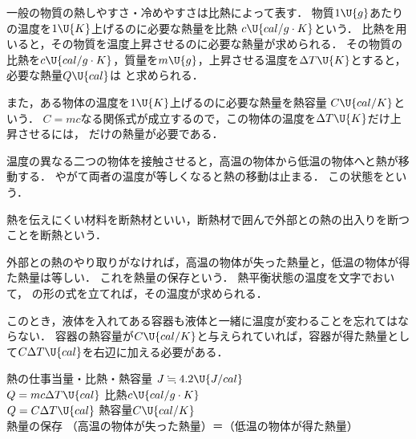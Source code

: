 一般の物質の熱しやすさ・冷めやすさは比熱によって表す．
物質$1\U{g}$あたりの温度を$1\U{K}$上げるのに必要な熱量を{\gtfamily 比熱} $c\U{cal/g\cdot K}$という．
比熱を用いると，その物質を温度上昇させるのに必要な熱量が求められる．
その物質の比熱を$c\U{cal/g\cdot K}$，質量を$m\U{g}$，上昇させる温度を$\Delta T\U{K}$とすると，必要な熱量$Q\U{cal}$は
と求められる．

また，ある物体の温度を$1\U{K}$上げるのに必要な熱量を{\gtfamily 熱容量} $C\U{cal/K}$という．
$C=mc$なる関係式が成立するので，この物体の温度を$\Delta T\U{K}$だけ上昇させるには，
だけの熱量が必要である．

温度の異なる二つの物体を接触させると，高温の物体から低温の物体へと熱が移動する．
やがて両者の温度が等しくなると熱の移動は止まる．
この状態をという．

熱を伝えにくい材料を{\gtfamily 断熱材}といい，断熱材で囲んで外部との熱の出入りを断つことを{\gtfamily 断熱}という．

\hspace{1zw}外部との熱のやり取りがなければ，{\gtfamily 高温の物体が失った熱量と，低温の物体が得た熱量は等しい．}
これを{\gtfamily 熱量の保存}という．
熱平衡状態の温度を文字でおいて，
の形の式を立てれば，その温度が求められる．

このとき，{\gtfamily 液体を入れてある容器も液体と一緒に温度が変わる}ことを忘れてはならない．
容器の熱容量が$C\U{cal/K}$と与えられていれば，容器が得た熱量として$C\Delta T\U{cal}$を右辺に加える必要がある．

\begin{matome}{熱の仕事当量・比熱・熱容量}
 \hspace{3mm} $J \fallingdotseq 4.2\U{J/cal}$\\
\hspace{3mm} $Q=mc\Delta T\U{cal}$\hspace{10mm} 比熱$c\U{cal/g\cdot K}$\\
\hspace{3mm} $Q=C\Delta T\U{cal}$\hspace{13mm} 熱容量$C\U{cal/K}$\\
\hspace{3mm} 熱量の保存\hspace{9mm} （高温の物体が失った熱量）＝（低温の物体が得た熱量）
\end{matome}

